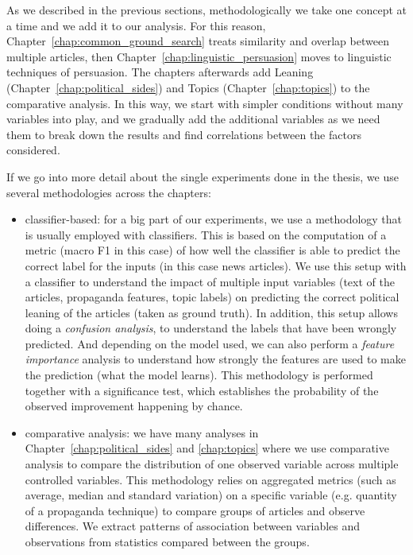 As we described in the previous sections, methodologically we take one concept at a time and we add it to our analysis. For this reason, Chapter~\ref{chap:common_ground_search} treats similarity and overlap between multiple articles, then Chapter~\ref{chap:linguistic_persuasion} moves to linguistic techniques of persuasion. The chapters afterwards add Leaning (Chapter~\ref{chap:political_sides}) and Topics (Chapter~\ref{chap:topics}) to the comparative analysis. In this way, we start with simpler conditions without many variables into play, and we gradually add the additional variables as we need them to break down the results and find correlations between the factors considered.


If we go into more detail about the single experiments done in the thesis, we use several methodologies across the chapters:
\begin{itemize}
    \item classifier-based: for a big part of our experiments, we use a methodology that is usually employed with classifiers. This is based on the computation of a metric (macro F1 in this case) of how well the classifier is able to predict the correct label for the inputs (in this case news articles). We use this setup with a classifier to understand the impact of multiple input variables (text of the articles, propaganda features, topic labels) on predicting the correct political leaning of the articles (taken as ground truth). In addition, this setup allows doing a \emph{confusion analysis}, to understand the labels that have been wrongly predicted. And depending on the model used, we can also perform a \emph{feature importance} analysis to understand how strongly the features are used to make the prediction (what the model learns). This methodology is performed together with a significance test, which establishes the probability of the observed improvement happening by chance.
    \item comparative analysis: we have many analyses in Chapter~\ref{chap:political_sides} and \ref{chap:topics} where we use comparative analysis to compare the distribution of one observed variable across multiple controlled variables. This methodology relies on aggregated metrics (such as average, median and standard variation) on a specific variable (e.g. quantity of a propaganda technique) to compare groups of articles and observe differences. We extract patterns of association between variables and observations from statistics compared between the groups.
\end{itemize}


